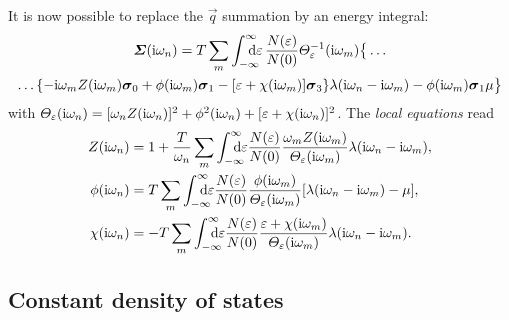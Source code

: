 It is now possible to replace the $\vec q$ summation by an energy integral:
%
\begin{multline} \label{local self-energy}
    \vec \Sigma(\I \omega_n)
    = T \sum_m \int \from{-\infty} \till \infty \D \epsilon \,
    \frac{N(\epsilon)}{N(0)}
    \Theta_\epsilon^{-1}(\I \omega_m) \big \{ \dots
        \\
        \dots \{
            - \I \omega_m Z(\I \omega_m) \vec \sigma_0
            + \phi(\I \omega_m) \vec \sigma_1
            - [\epsilon + \chi(\I \omega_m)] \vec \sigma_3
            \}
        \lambda(\I \omega_n - \I \omega_m)
        - \phi(\I \omega_m) \vec \sigma_1 \mu
    \big \}
\end{multline}
%
with $\varTheta_\varepsilon(\mathrm i \omega_n) = [\omega_n Z(\mathrm i \omega_n)]^2 + \phi^2(\mathrm i
\omega_n) + [\varepsilon + \chi(\mathrm i \omega_n)]^2$. The \emph{local 
equations} read
%
\begin{subequations} \label{local Eliashberg equations}
   \begin{align}
      Z(\I \omega_n) &= 1 + \frac T {\omega_n} \sum_m
      \int \from{-\infty} \till \infty \D \epsilon \frac{N(\epsilon)}{N(0)}
      \frac{\omega_m Z (\I \omega_m)}{\Theta_\epsilon(\I \omega_m)}
      \lambda(\I \omega_n - \I \omega_m),
      \\
      \phi(\I \omega_n) &= T \sum_m
      \int \from{-\infty} \till \infty \D \epsilon \frac{N(\epsilon)}{N(0)}
      \frac{\phi(\I \omega_m)}{\Theta_\epsilon(\I \omega_m)}
      [\lambda(\I \omega_n - \I \omega_m) - \mu],
      \\
      \chi(\I \omega_n) &= -T \sum_m
      \int \from{-\infty} \till \infty \D \epsilon \frac{N(\epsilon)}{N(0)}
      \frac{\epsilon + \chi(\I \omega_m)}{\Theta_\epsilon(\I \omega_m)}
      \lambda(\I \omega_n - \I \omega_m).
   \end{align}
\end{subequations}

\subsection{Constant density of states}

